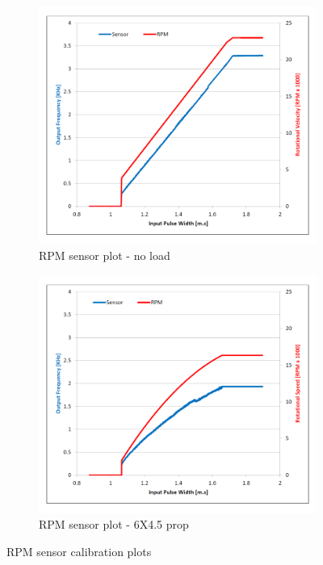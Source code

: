 \par
\begin{figure}[htbp]
\begin{subfigure}{0.5\textwidth}
\centering
\includegraphics[width=\textwidth]{graphs/rpm-sensor-noload}
\caption{RPM sensor plot - no load}
\label{fig:rpm-sensor-noload}
\end{subfigure}
\begin{subfigure}{0.5\textwidth}
\centering
\includegraphics[width=\textwidth]{graphs/rpm-sensor-prop}
\caption{RPM sensor plot - 6X4.5 prop}
\label{fig:rpm-sensor-prop}
\end{subfigure}
\caption{RPM sensor calibration plots}
\label{fig:rpm-sensor}
\end{figure}
